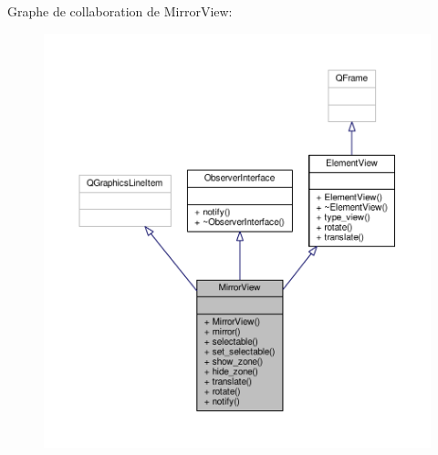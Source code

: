 Graphe de collaboration de Mirror\+View\+:\nopagebreak
\begin{figure}[H]
\begin{center}
\leavevmode
\includegraphics[width=350pt]{d1/de7/classMirrorView__coll__graph}
\end{center}
\end{figure}
